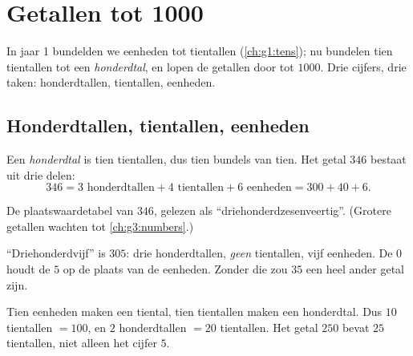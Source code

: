 \chapter{Getallen tot 1000}\label{ch:g2:numbers}

In jaar 1 bundelden we eenheden tot tientallen (\cref{ch:g1:tens}); nu
bundelen tien tientallen tot een \emph{honderdtal}, en lopen de
getallen door tot $1000$. Drie cijfers, drie taken: honderdtallen,
tientallen, eenheden.

\section{Honderdtallen, tientallen, eenheden}

\begin{definition}\label{def:g2:numbers:places}
Een \emph{honderdtal} is tien tientallen, dus tien bundels van tien.
Het getal $346$ bestaat uit drie delen:
\[
346 = 3 \text{ honderdtallen} + 4 \text{ tientallen} + 6 \text{ eenheden}
= 300 + 40 + 6 .
\]
\end{definition}

\begin{omfigure}

{\small De plaatswaardetabel van $346$, gelezen als
``driehonderdzesenveertig''. (Grotere getallen wachten tot
\cref{ch:g3:numbers}.)}
\end{omfigure}

\begin{example}\label{ex:g2:numbers:zero}
``Driehonderdvijf'' is $305$: drie honderdtallen, \emph{geen}
tientallen, vijf eenheden. De $0$ houdt de $5$ op de plaats van de
eenheden. Zonder die  zou $35$ een heel ander getal zijn.
\end{example}

\begin{example}[Wisselen]\label{ex:g2:numbers:exchange}
Tien eenheden maken een tiental, tien tientallen maken een honderdtal.
Dus $10$ tientallen $= 100$, en $2$ honderdtallen $= 20$ tientallen.
Het getal $250$ bevat $25$ tientallen, niet alleen het cijfer $5$.
\end{example}

